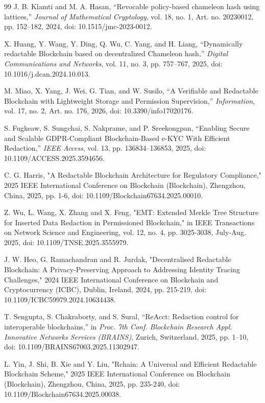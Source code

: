 \documentclass[lettersize,journal]{IEEEtran}
\begin{document}
\begin{thebibliography}{99}
J. B. Klamti and M. A. Hasan,
``Revocable policy-based chameleon hash using lattices,''
\textit{Journal of Mathematical Cryptology}, vol. 18, no. 1, Art. no. 20230012,
pp. 152--182, 2024,
doi: 10.1515/jmc-2023-0012.

X. Huang, Y. Wang, Y. Ding, Q. Wu, C. Yang, and H. Liang,
``Dynamically redactable Blockchain based on decentralized Chameleon hash,''
\textit{Digital Communications and Networks}, vol. 11, no. 3, pp. 757--767, 2025,
doi: 10.1016/j.dcan.2024.10.013.

M. Miao, X. Yang, J. Wei, G. Tian, and W. Susilo,
``A Verifiable and Redactable Blockchain with Lightweight Storage and Permission Supervision,''
\textit{Information}, vol. 17, no. 2, Art. no. 176, 2026,
doi: 10.3390/info17020176.

S. Fugkeaw, S. Sungchai, S. Nakprame, and P. Sreekongpan,
``Enabling Secure and Scalable GDPR-Compliant Blockchain-Based e-KYC With Efficient Redaction,''
\textit{IEEE Access}, vol. 13, pp. 136834--136853, 2025,
doi: 10.1109/ACCESS.2025.3594656.


C. G. Harris, "A Redactable Blockchain Architecture for Regulatory Compliance," 2025 IEEE International Conference on Blockchain (Blockchain), Zhengzhou, China, 2025, pp. 1-6, doi: 10.1109/Blockchain67634.2025.00010.

Z. Wu, L. Wang, X. Zhang and X. Feng, "EMT: Extended Merkle Tree Structure for Inserted Data Redaction in Permissioned Blockchain," in IEEE Transactions on Network Science and Engineering, vol. 12, no. 4, pp. 3025-3038, July-Aug. 2025, doi: 10.1109/TNSE.2025.3555979.

J. W. Heo, G. Ramachandran and R. Jurdak, "Decentralised Redactable Blockchain: A Privacy-Preserving Approach to Addressing Identity Tracing Challenges," 2024 IEEE International Conference on Blockchain and Cryptocurrency (ICBC), Dublin, Ireland, 2024, pp. 215-219, doi: 10.1109/ICBC59979.2024.10634438.


T. Sengupta, S. Chakraborty, and S. Sural,
``ReAcct: Redaction control for interoperable blockchains,''
in \textit{Proc. 7th Conf. Blockchain Research Appl. Innovative
Networks Services (BRAINS)}, Zurich, Switzerland, 2025,
pp. 1--10, doi: 10.1109/BRAINS67003.2025.11302947.

L. Yin, J. Shi, B. Xie and Y. Liu, "Rchain: A Universal and Efficient Redactable Blockchain Scheme," 2025 IEEE International Conference on Blockchain (Blockchain), Zhengzhou, China, 2025, pp. 235-240, doi: 10.1109/Blockchain67634.2025.00038.


\end{thebibliography}
\end{document}
